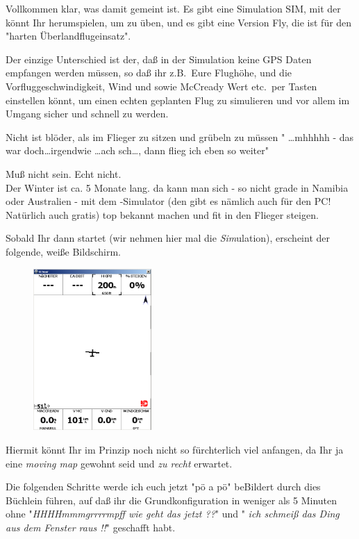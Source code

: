Vollkommen klar, was damit gemeint ist. Es gibt eine Simulation \textsf{SIM}, mit der könnt Ihr herumspielen, um zu üben, und es gibt eine Version \textsf{Fly}, die ist für den "harten Überlandflugeinsatz". 

Der einzige Unterschied ist der, daß in der Simulation keine GPS Daten empfangen werden müssen, so daß ihr z.B.\ Eure Flughöhe, und die Vorfluggeschwindigkeit, Wind und sowie McCready Wert etc.\ per Tasten einstellen könnt, um einen echten geplanten Flug zu simulieren und vor allem im Umgang sicher und schnell zu werden. 

Nicht ist blöder, als im Flieger zu sitzen und grübeln zu müssen " \dots  mhhhhh -  das war doch\dots  irgendwie \dots ach sch\dots , dann flieg ich eben so weiter"

Muß nicht sein. Echt nicht.\\[0.75em] 

Der Winter ist ca. 5 Monate lang. da kann man sich - so nicht grade in Namibia oder Australien - mit dem \xc -Simulator (den gibt es nämlich auch für den PC! Natürlich auch gratis) top bekannt machen und fit in den Flieger steigen.

Sobald Ihr \xc dann startet (wir nehmen hier mal die \textsl{Sim}ulation), erscheint der folgende, weiße Bildschirm. 

\begin{figure}
\includegraphics[width=4.5cm]{Bilder/veryfirst.png}
\end{figure}


Hiermit könnt Ihr im Prinzip noch nicht so fürchterlich viel anfangen, da Ihr ja eine \textsl{moving map} gewohnt seid und \textsl{zu recht} erwartet. 

Die folgenden Schritte werde ich euch jetzt "pö a pö" beBildert durch dies Büchlein führen, auf daß ihr die Grundkonfiguration in weniger als 5 Minuten ohne "\textsl{HHHHmmmgrrrrmpff wie geht das jetzt ??}"  und " \textsl{ich schmeiß das Ding aus  dem Fenster raus !!}"  geschafft habt.

